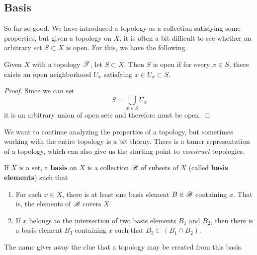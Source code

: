 \subsection{Basis} 

  So far so good. We have introduced a topology as a collection satisfying some properties, but given a topology on $X$, it is often a bit difficult to see whether an arbitrary set $S \subset X$ is open. For this, we have the following. 

  \begin{lemma}
    Given $X$ with a topology $\operatorname{\mathscr{T}}$, let $S \subset X$. Then $S$ is open if for every $x \in S$, there exists an open neighborhood $U_x$ satisfying $x \in U_x \subset S$. 
  \end{lemma}
  \begin{proof}
    Since we can set 
    \begin{equation}
      S = \bigcup_{x \in S} U_x
    \end{equation}
    it is an arbitrary union of open sets and therefore must be open. 
  \end{proof}

  We want to continue analyzing the properties of a topology, but sometimes working with the entire topology is a bit thorny. There is a tamer representation of a topology, which can also give us the starting point to \textit{construct} topologies. 

  \begin{definition}[Basis]
    If $X$ is a set, a \textbf{basis} on $X$ is a collection $\operatorname{\mathscr{B}}$ of subsets of $X$ (called \textbf{basis elements}) such that
    \begin{enumerate}
      \item For each $x \in X$, there is at least one basis element $B \in \operatorname{\mathscr{B}}$ containing $x$. That is, the elements of $\operatorname{\mathscr{B}}$ covers $X$. 
      \item If $x$ belongs to the intersection of two basis elements $B_1$ and $B_2$, then there is a basis element $B_3$ containing $x$ such that $B_3 \subset (B_1 \cap B_2)$. 
    \end{enumerate}
  \end{definition} 

  The name gives away the clue that a topology may be created from this basis.  

